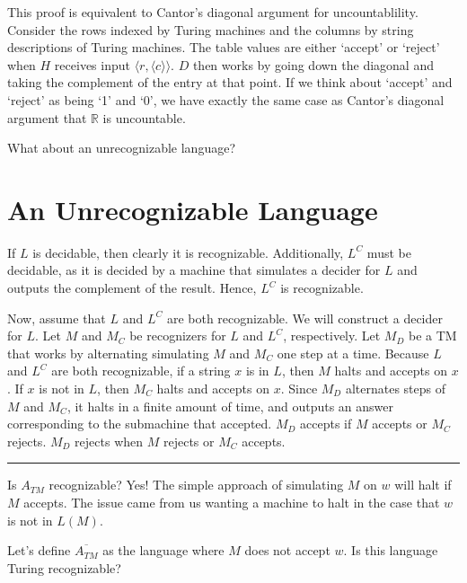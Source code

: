 \documentclass[twoside]{article}
\newenvironment{proof}{{\bf Proof:}}{\hfill\rule{2mm}{2mm}}
\begin{document}
This proof is equivalent to Cantor's diagonal argument for uncountablility.  Consider the rows indexed by Turing machines and the columns by string descriptions of Turing machines.  The table values are either `accept' or `reject' when $H$ receives input $\langle r,\langle c \rangle \rangle$.  $D$ then works by going down the diagonal and taking the complement of the entry at that point.  If we think about `accept' and `reject' as being `1' and `0', we have exactly the same case as Cantor's diagonal argument that $\mathbb{R}$ is uncountable.

What about an unrecognizable language?  

\section*{An Unrecognizable Language}


\begin{proof}
	
	If $L$ is decidable, then clearly it is recognizable.  Additionally, $L^C$ must be decidable, as it is decided by a machine that simulates a decider for $L$ and outputs the complement of the result.
	Hence, $L^C$ is recognizable.
	
	Now, assume that $L$ and $L^C$ are both recognizable.  We will construct a decider for $L$.  Let $M$ and $M_C$ be recognizers for $L$ and $L^C$, respectively.  Let $M_D$ be a TM that works by alternating simulating $M$ and $M_C$ one step at a time.  Because $L$ and $L^C$ are both recognizable, if a string $x$ is in $L$, then $M$ halts and accepts on $x$.  If $x$ is not in $L$, then $M_C$ halts and accepts on $x$.  Since $M_D$ alternates steps of $M$ and $M_C$, it halts in a finite amount of time, and outputs an answer corresponding to the submachine that accepted.  $M_D$ accepts if $M$ accepts or $M_C$ rejects.  $M_D$ rejects when $M$ rejects or $M_C$ accepts.
	
	
	
	
\end{proof}


Is $A_{TM}$ recognizable?  Yes!  The simple approach of simulating $M$ on $w$ will halt if $M$ accepts.  The issue came from us wanting a machine to halt in the case that $w$ is not in $L(M)$.

Let's define $\overline{A_{TM}}$ as the language where $M$ does not accept $w$.  Is this language Turing recognizable?
\end{document}
